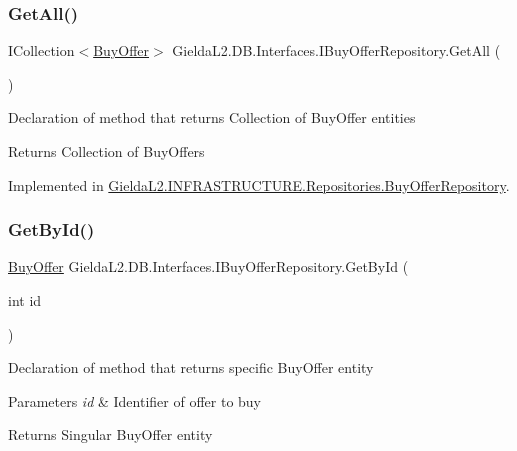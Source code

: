 \subsubsection{\texorpdfstring{GetAll()}{GetAll()}}
{\footnotesize\ttfamily I\+Collection$<$\mbox{\hyperlink{class_gielda_l2_1_1_d_b_1_1_entities_1_1_buy_offer}{Buy\+Offer}}$>$ Gielda\+L2.\+D\+B.\+Interfaces.\+I\+Buy\+Offer\+Repository.\+Get\+All (\begin{DoxyParamCaption}{ }\end{DoxyParamCaption})}



Declaration of method that returns Collection of Buy\+Offer entities 

\begin{DoxyReturn}{Returns}
Collection of Buy\+Offers
\end{DoxyReturn}


Implemented in \mbox{\hyperlink{class_gielda_l2_1_1_i_n_f_r_a_s_t_r_u_c_t_u_r_e_1_1_repositories_1_1_buy_offer_repository_ab0ce549916d7e0cd138454a9768ed7c5}{Gielda\+L2.\+I\+N\+F\+R\+A\+S\+T\+R\+U\+C\+T\+U\+R\+E.\+Repositories.\+Buy\+Offer\+Repository}}.

\mbox{\label{interface_gielda_l2_1_1_d_b_1_1_interfaces_1_1_i_buy_offer_repository_ac7c415d55971e7a12d1f8d2c96d3d3e2}} 
\subsubsection{\texorpdfstring{GetById()}{GetById()}}
{\footnotesize\ttfamily \mbox{\hyperlink{class_gielda_l2_1_1_d_b_1_1_entities_1_1_buy_offer}{Buy\+Offer}} Gielda\+L2.\+D\+B.\+Interfaces.\+I\+Buy\+Offer\+Repository.\+Get\+By\+Id (\begin{DoxyParamCaption}\item[{int}]{id }\end{DoxyParamCaption})}



Declaration of method that returns specific Buy\+Offer entity 


\begin{DoxyParams}{Parameters}
{\em id} & Identifier of offer to buy\\
\hline
\end{DoxyParams}
\begin{DoxyReturn}{Returns}
Singular Buy\+Offer entity
\end{DoxyReturn}


